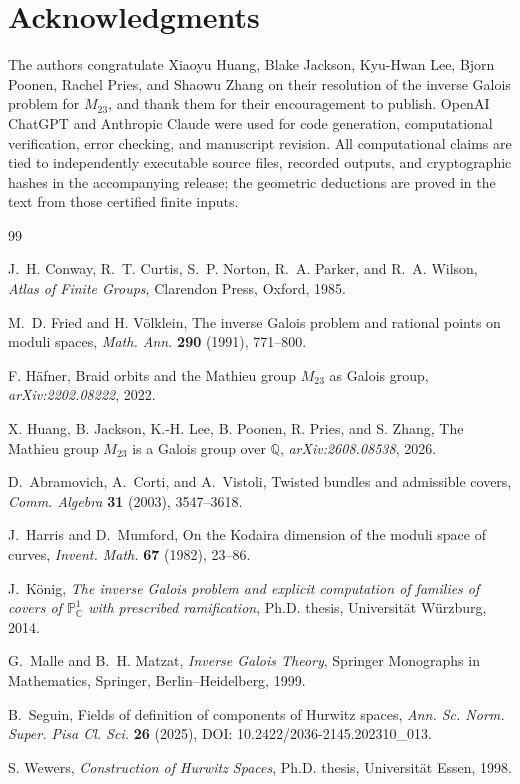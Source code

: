 \documentclass[11pt]{article}
\theoremstyle{remark}
\newcommand{\Q}{\mathbb Q}
\begin{document}
\normalsize

\section*{Acknowledgments}
The authors congratulate Xiaoyu Huang, Blake Jackson, Kyu-Hwan Lee, Bjorn Poonen, Rachel Pries, and Shaowu Zhang on their resolution of the inverse Galois problem for $M_{23}$, and thank them for their encouragement to publish.  OpenAI ChatGPT and Anthropic Claude were used for code generation, computational verification, error checking, and manuscript revision.  All computational claims are tied to independently executable source files, recorded outputs, and cryptographic hashes in the accompanying release; the geometric deductions are proved in the text from those certified finite inputs.

\begin{thebibliography}{99}
\scriptsize
\setlength{\itemsep}{0.02em}
\setlength{\parsep}{0pt}

J.~H. Conway, R.~T. Curtis, S.~P. Norton, R.~A. Parker, and R.~A. Wilson,
\emph{Atlas of Finite Groups}, Clarendon Press, Oxford, 1985.





M.~D. Fried and H. V\"olklein,
The inverse Galois problem and rational points on moduli spaces,
\emph{Math. Ann.} \textbf{290} (1991), 771--800.

F. H\"afner,
Braid orbits and the Mathieu group $M_{23}$ as Galois group,
\emph{arXiv:2202.08222}, 2022.

X. Huang, B. Jackson, K.-H. Lee, B. Poonen, R. Pries, and S. Zhang,
The Mathieu group $M_{23}$ is a Galois group over $\Q$,
\emph{arXiv:2608.08538}, 2026.

D.~Abramovich, A.~Corti, and A.~Vistoli,
Twisted bundles and admissible covers,
\emph{Comm. Algebra} \textbf{31} (2003), 3547--3618.

J.~Harris and D.~Mumford,
On the Kodaira dimension of the moduli space of curves,
\emph{Invent. Math.} \textbf{67} (1982), 23--86.

J.~K\"onig,
\emph{The inverse Galois problem and explicit computation of families of covers of $\mathbb P^1_{\mathbb C}$ with prescribed ramification},
Ph.D. thesis, Universit\"at W\"urzburg, 2014.

G.~Malle and B.~H. Matzat,
\emph{Inverse Galois Theory}, Springer Monographs in Mathematics,
Springer, Berlin--Heidelberg, 1999.

B.~Seguin,
Fields of definition of components of Hurwitz spaces,
\emph{Ann. Sc. Norm. Super. Pisa Cl. Sci.} \textbf{26} (2025),
DOI: 10.2422/2036-2145.202310\_013.

S. Wewers,
\emph{Construction of Hurwitz Spaces}, Ph.D. thesis, Universit\"at Essen, 1998.

\end{thebibliography}
\end{document}
